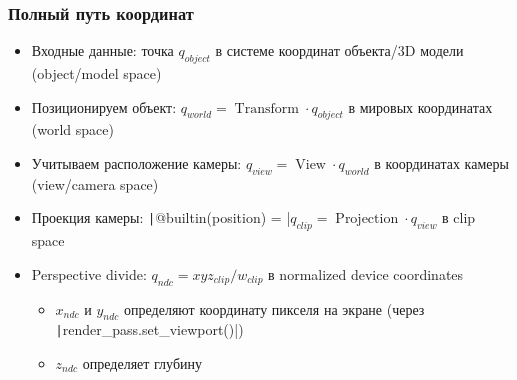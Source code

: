 \documentclass[10pt]{beamer}
\begin{document}
\begin{frame}[fragile]
\frametitle{Полный путь координат}
\begin{itemize}
\item Входные данные: точка \begin{math}q_{object}\end{math} в системе координат объекта/3D модели (object/model space)
\pause
\item Позиционируем объект: \begin{math}q_{world} = \operatorname{Transform} \cdot q_{object}\end{math} в мировых координатах (world space)
\pause
\item Учитываем расположение камеры: \begin{math}q_{view} = \operatorname{View} \cdot q_{world}\end{math} в координатах камеры (view/camera space)
\pause
\item Проекция камеры: \texttt|@builtin(position) = |\begin{math}q_{clip} = \operatorname{Projection} \cdot q_{view}\end{math} в clip space
\pause
\item Perspective divide: \begin{math}q_{ndc} = xyz_{clip} / w_{clip}\end{math} в normalized device coordinates
\pause
\begin{itemize}
\item \begin{math}x_{ndc}\end{math} и \begin{math}y_{ndc}\end{math} определяют координату пикселя на экране (через \texttt|render_pass.set_viewport()|)
\item \begin{math}z_{ndc}\end{math} определяет глубину
\end{itemize}
\end{itemize}
\end{frame}
\end{document}
